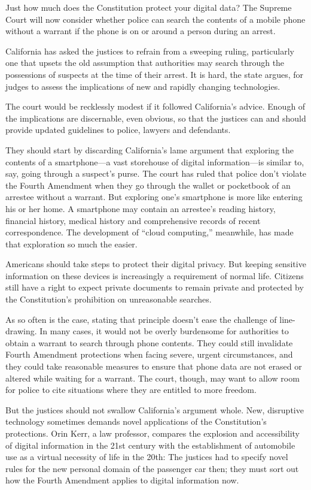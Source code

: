 Just how much does the Constitution protect your digital data? The
Supreme Court will now consider whether police can search the contents
of a mobile phone without a warrant if the phone is on or around a
person during an arrest.

California has asked the justices to refrain from a sweeping ruling,
particularly one that upsets the old assumption that authorities may
search through the possessions of suspects at the time of their arrest.
It is hard, the state argues, for judges to assess the implications of
new and rapidly changing technologies.

The court would be recklessly modest if it followed California's advice.
Enough of the implications are discernable, even obvious, so that the
justices can and should provide updated guidelines to police, lawyers and
defendants.

They should start by discarding California's lame argument that
exploring the contents of a smartphone---a vast storehouse of digital
information---is similar to, say, going through a suspect's purse. The
court has ruled that police don't violate the Fourth Amendment when they
go through the wallet or pocketbook of an arrestee without a warrant.
But exploring one's smartphone is more like entering his or her home. A
smartphone may contain an arrestee's reading history, financial history,
medical history and comprehensive records of recent correspondence. The
development of ``cloud computing,'' meanwhile, has made that exploration
so much the easier.

Americans should take steps to protect their digital privacy. But
keeping sensitive information on these devices is increasingly a
requirement of normal life. Citizens still have a right to expect
private documents to remain private and protected by the Constitution's
prohibition on unreasonable searches.

As so often is the case, stating that principle doesn't ease the
challenge of line-drawing. In many cases, it would not be overly
burdensome for authorities to obtain a warrant to search through phone
contents. They could still invalidate Fourth Amendment protections when
facing severe, urgent circumstances, and they could take reasonable
measures to ensure that phone data are not erased or altered while
waiting for a warrant. The court, though, may want to allow room for
police to cite situations where they are entitled to more freedom.

But the justices should not swallow California's argument whole. New,
disruptive technology sometimes demands novel applications of the
Constitution's protections. Orin Kerr, a law professor, compares the
explosion and accessibility of digital information in the 21st century
with the establishment of automobile use as a virtual necessity of life
in the 20th: The justices had to specify novel rules for the new
personal domain of the passenger car then; they must sort out how the
Fourth Amendment applies to digital information now.


